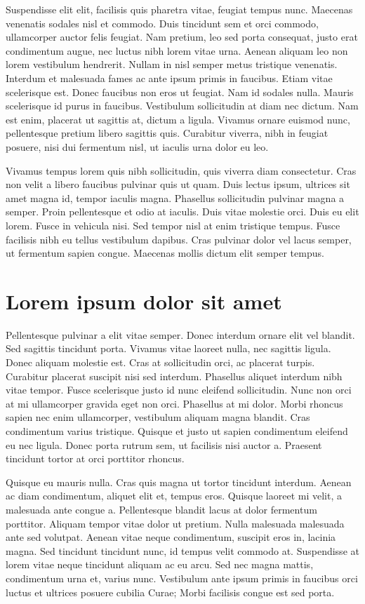 Suspendisse elit elit, facilisis quis pharetra vitae, feugiat tempus nunc. Maecenas venenatis sodales nisl et commodo. Duis tincidunt sem et orci commodo, ullamcorper auctor felis feugiat. Nam pretium, leo sed porta consequat, justo erat condimentum augue, nec luctus nibh lorem vitae urna. Aenean aliquam leo non lorem vestibulum hendrerit. Nullam in nisl semper metus tristique venenatis. Interdum et malesuada fames ac ante ipsum primis in faucibus. Etiam vitae scelerisque est. Donec faucibus non eros ut feugiat. Nam id sodales nulla. Mauris scelerisque id purus in faucibus. Vestibulum sollicitudin at diam nec dictum. Nam est enim, placerat ut sagittis at, dictum a ligula. Vivamus ornare euismod nunc, pellentesque pretium libero sagittis quis. Curabitur viverra, nibh in feugiat posuere, nisi dui fermentum nisl, ut iaculis urna dolor eu leo.

Vivamus tempus lorem quis nibh sollicitudin, quis viverra diam consectetur. Cras non velit a libero faucibus pulvinar quis ut quam. Duis lectus ipsum, ultrices sit amet magna id, tempor iaculis magna. Phasellus sollicitudin pulvinar magna a semper. Proin pellentesque et odio at iaculis. Duis vitae molestie orci. Duis eu elit lorem. Fusce in vehicula nisi. Sed tempor nisl at enim tristique tempus. Fusce facilisis nibh eu tellus vestibulum dapibus. Cras pulvinar dolor vel lacus semper, ut fermentum sapien congue. Maecenas mollis dictum elit semper tempus.

\section{Lorem ipsum dolor sit amet}\label{sec:LABEL_CHP_1_SEC_G}
Pellentesque pulvinar a elit vitae semper. Donec interdum ornare elit vel blandit. Sed sagittis tincidunt porta. Vivamus vitae laoreet nulla, nec sagittis ligula. Donec aliquam molestie est. Cras at sollicitudin orci, ac placerat turpis. Curabitur placerat suscipit nisi sed interdum. Phasellus aliquet interdum nibh vitae tempor. Fusce scelerisque justo id nunc eleifend sollicitudin. Nunc non orci at mi ullamcorper gravida eget non orci. Phasellus at mi dolor. Morbi rhoncus sapien nec enim ullamcorper, vestibulum aliquam magna blandit. Cras condimentum varius tristique. Quisque et justo ut sapien condimentum eleifend eu nec ligula. Donec porta rutrum sem, ut facilisis nisi auctor a. Praesent tincidunt tortor at orci porttitor rhoncus.

Quisque eu mauris nulla. Cras quis magna ut tortor tincidunt interdum. Aenean ac diam condimentum, aliquet elit et, tempus eros. Quisque laoreet mi velit, a malesuada ante congue a. Pellentesque blandit lacus at dolor fermentum porttitor. Aliquam tempor vitae dolor ut pretium. Nulla malesuada malesuada ante sed volutpat. Aenean vitae neque condimentum, suscipit eros in, lacinia magna. Sed tincidunt tincidunt nunc, id tempus velit commodo at. Suspendisse at lorem vitae neque tincidunt aliquam ac eu arcu. Sed nec magna mattis, condimentum urna et, varius nunc. Vestibulum ante ipsum primis in faucibus orci luctus et ultrices posuere cubilia Curae; Morbi facilisis congue est sed porta.

